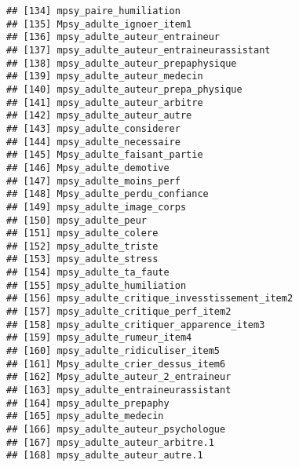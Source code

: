 \documentclass[
]{article}
\begin{document}
\begin{verbatim}
## [134] mpsy_paire_humiliation                                           
## [135] Mpsy_adulte_ignoer_item1                                         
## [136] mpsy_adulte_auteur_entraineur                                    
## [137] mpsy_adulte_auteur_entraineurassistant                           
## [138] mpsy_adulte_auteur_prepaphysique                                 
## [139] mpsy_adulte_auteur_medecin                                       
## [140] mpsy_adulte_auteur_prepa_physique                                
## [141] mpsy_adulte_auteur_arbitre                                       
## [142] mpsy_adulte_auteur_autre                                         
## [143] mpsy_adulte_considerer                                           
## [144] mpsy_adulte_necessaire                                           
## [145] Mpsy_adulte_faisant_partie                                       
## [146] Mpsy_adulte_demotive                                             
## [147] mpsy_adulte_moins_perf                                           
## [148] Mpsy_adulte_perdu_confiance                                      
## [149] mpsy_adulte_image_corps                                          
## [150] mpsy_adulte_peur                                                 
## [151] mpsy_adulte_colere                                               
## [152] mpsy_adulte_triste                                               
## [153] mpsy_adulte_stress                                               
## [154] mpsy_adulte_ta_faute                                             
## [155] mpsy_adulte_humiliation                                          
## [156] mpsy_adulte_critique_invesstissement_item2                       
## [157] mpsy_adulte_critique_perf_item2                                  
## [158] mpsy_adulte_critiquer_apparence_item3                            
## [159] mpsy_adulte_rumeur_item4                                         
## [160] mpsy_adulte_ridiculiser_item5                                    
## [161] Mpsy_adulte_crier_dessus_item6                                   
## [162] Mpsy_adulte_auteur_2_entraineur                                  
## [163] mpsy_adulte_entraineurassistant                                  
## [164] mpsy_adulte_prepaphy                                             
## [165] mpsy_adulte_medecin                                              
## [166] mpsy_adulte_auteur_psychologue                                   
## [167] mpsy_adulte_auteur_arbitre.1                                     
## [168] mpsy_adulte_auteur_autre.1                                       

\end{verbatim}
\end{document}
